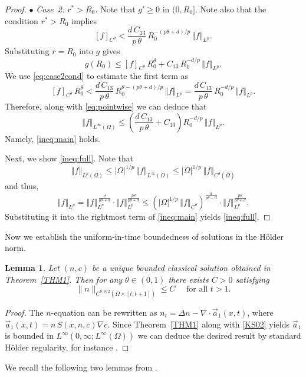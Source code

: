 \documentclass{amsart}
\newtheorem{lemma}[defn]{Lemma}
\numberwithin{equation}{section}
\newcommand{\norm}[1]{\left\Vert #1 \right\Vert}
\newcommand{\abs}[1]{\left| #1 \right|}
\begin{document}
\begin{proof}
$\bullet$ \emph{Case~2: $r^* > R_0$.}
Note that $g'\ge0$ in $(0,R_{0}]$. Note also that
the condition $r^* > R_0$ implies
\begin{equation}\label{eq:case2cond}
  [f]_{C^\theta}
  < \frac{d\,C_{13}}{p\,\theta}\,R_0^{-(p\theta+d)/p}\,\norm{f}_{L^p}.
\end{equation}
Substituting $r = R_0$ into $g$ gives
\[
  g(R_{0})
  \leq [f]_{C^\theta}\,R_0^\theta + C_{13}\,R_0^{-d/p}\,\norm{f}_{L^p}.
\]
We use \eqref{eq:case2cond} to estimate the first term as
\[
  [f]_{C^\theta}\,R_0^\theta
  < \frac{d\,C_{13}}{p\,\theta}\,R_0^{\theta-(p\theta+d)/p}\,\norm{f}_{L^p}
  = \frac{d\,C_{13}}{p\,\theta}\,R_0^{-d/p}\,\norm{f}_{L^p}.
\]
Therefore,   along with \eqref{eq:pointwise} we can deduce that
\begin{equation}\label{eq:case2}
  \norm{f}_{L^\infty(\Omega)}
  \leq \left(\frac{d\,C_{13}}{p\,\theta} + C_{13}\right)R_0^{-d/p}\,\norm{f}_{L^p}.
\end{equation}
Namely, \eqref{ineq:main} holds.

Next, we show \eqref{ineq:full}. Note that
\[
  \norm{f}_{L^p(\Omega)} \leq \abs{\Omega}^{1/p}\,\norm{f}_{L^\infty(\Omega)}
  \leq \abs{\Omega}^{1/p}\,\norm{f}_{C^\theta(\overline\Omega)}
\]
and thus, 
\[
  \norm{f}_{L^p}
  = \norm{f}_{L^p}^{\,\frac{d}{p\theta + d}}\cdot\norm{f}_{L^p}^{\frac{p\theta}{p\theta + d}}
  \leq \left(\abs{\Omega}^{1/p}\,\norm{f}_{C^\theta}\right)^{\frac{d}{p\theta + d}}\cdot\norm{f}_{L^p}^{\frac{p\theta}{p\theta + d}}.
\]
Substituting it into the rightmost term of \eqref{ineq:main} yields \eqref{ineq:full}.
\end{proof}
Now we establish 
the uniform-in-time boundedness of solutions in the H\"older norm.
\begin{lemma}\label{HOLDERNORM}
Let $(n,c)$ be a unique bounded classical solution obtained in Theorem~\ref{THM1}. Then for any $\theta\in(0,1)$ there exists $C>0$ satisfying
\[
\|n\|_{C^{\theta,\theta/2}(\overline{\Omega}\times[t,t+1])}\le C\quad\mbox{ for all }t>1.
\]
\end{lemma}
\begin{proof}
The $n$-equation can be rewritten as 
$n_{t}=\Delta n-\nabla \cdot \vec{a}_{1}(x,t)$, where $\vec{a}_{1}(x,t)=n\,S(x,n,c)\nabla c$. Since Theorem~\ref{THM1} along with \eqref{KS02} yields $\vec{a}_{1}$ is bounded in $L^{\infty}(0,\infty;L^{\infty}(\Omega))$ we can deduce the desired result by standard H\"older regularity, for instance \cite[Thm.~1.3]{Porzio_1993}.
\end{proof}
We recall the following two lemmas from \cite[Lem.~3 and Lem.~4]{Ahn_Kang_Lee_2019}.
\end{document}
